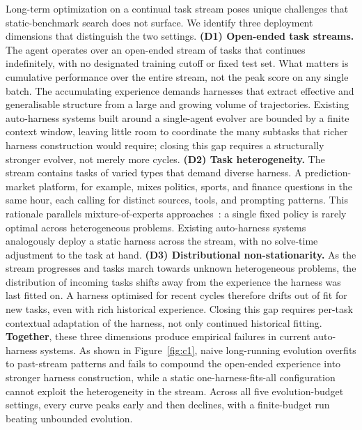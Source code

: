 Long-term optimization on a continual task stream poses unique challenges that static-benchmark search does not surface. We identify three deployment dimensions that distinguish the two settings. \textbf{(D1) Open-ended task streams.} The agent operates over an open-ended stream of tasks that continues indefinitely, with no designated training cutoff or fixed test set. What matters is cumulative performance over the entire stream, not the peak score on any single batch. {The accumulating experience demands harnesses that extract effective and generalisable structure from a large and growing volume of trajectories. Existing auto-harness systems built around a single-agent evolver are bounded by a finite context window, leaving little room to coordinate the many subtasks that richer harness construction would require; closing this gap requires a structurally stronger evolver, not merely more cycles.} \textbf{(D2) Task heterogeneity.} The stream contains tasks of varied types that demand diverse harness. A prediction-market platform, for example, mixes politics, sports, and finance questions in the same hour, each calling for distinct sources, tools, and prompting patterns. This rationale parallels mixture-of-experts approaches~\cite{jacobs1991moe,shazeer2017moe}: a single fixed policy is rarely optimal across heterogeneous problems. {Existing auto-harness systems analogously deploy a static harness across the stream, with no solve-time adjustment to the task at hand.} \textbf{(D3) Distributional non-stationarity.} As the stream progresses and tasks march towards unknown heterogeneous problems, the distribution of incoming tasks shifts away from the experience the harness was last fitted on. A harness optimised for recent cycles therefore drifts out of fit for new tasks, even with rich historical experience. Closing this gap requires per-task contextual adaptation of the harness, not only continued historical fitting. \textbf{Together}, these three dimensions produce empirical failures in current auto-harness systems. As shown in Figure~\ref{fig:c1}, naive long-running evolution overfits to past-stream patterns and fails to compound the open-ended experience into stronger harness construction, while a static one-harness-fits-all configuration cannot exploit the heterogeneity in the stream. Across all five evolution-budget settings, every curve peaks early and then declines, with a finite-budget run beating unbounded evolution.


